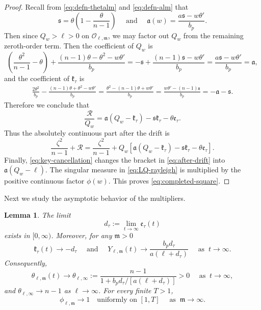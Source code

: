 \documentclass[reqno,12pt]{amsart}
\numberwithin{equation}{section}
\newtheorem{lem}[thm]{Lemma}
\theoremstyle{remark}
\begin{document}
\begin{proof}
Recall from \eqref{eq:defn-thetalm} and \eqref{eq:defn-alm} that 
$$\mathfrak s=\theta\left(1-\frac\theta {n-1}\right) \quad \text{ and } \quad \mathfrak a(w)= \frac{ a \mathfrak s- w\theta'}{b_p}. $$
Then since $Q_w>\ell>0$ on
$\mathcal O_{\ell,\mathfrak m}$, we may factor out $Q_w$
from the remaining zeroth-order term. Then the  coefficient of $Q_w$ is
$$
 \left(\frac{\theta^2}{n-1}-\theta\right)  +\frac{(n-1)\theta-\theta^2-w\theta'}{b_p} 
=-\mathfrak s+\frac{(n-1)\mathfrak s-w\theta'}{b_p}
=\frac{a\mathfrak s-w\theta'}{b_p}   =\mathfrak a,
$$
and the coefficient of $\mathfrak k_\tau$ is
\begin{align*}
\frac{2\theta^2}{b_p}  -\frac{(n-1)\theta+\theta^2-w\theta'}{b_p} 
=\frac{\theta^2-(n-1)\theta+w\theta'}{b_p}  =\frac{w\theta'-(n-1)\mathfrak s}{b_p} 
=-\mathfrak a-\mathfrak s.
\end{align*}
Therefore we conclude that
$$
 \frac{\mathcal R}{Q_w} =\mathfrak a(Q_w-\mathfrak k_\tau) -\mathfrak s\mathfrak k_\tau -\theta\mathfrak e_\tau.
$$
Thus the absolutely continuous part after the drift is
\begin{equation}\label{eq:after-drift}
\frac{\zeta^2}{n-1} + \mathcal R= \frac{\zeta^2}{n-1}
 +Q_w\left[ \mathfrak a(Q_w-\mathfrak k_\tau) 
-\mathfrak s\mathfrak k_\tau -\theta\mathfrak e_\tau
 \right].
\end{equation}
Finally, \eqref{eq:key-cancellation} changes the bracket in
\eqref{eq:after-drift} into $\mathfrak a(Q_w-\ell)$.  The singular measure in \eqref{eq:LQ-rayleigh} is multiplied by the positive continuous factor $\phi(w)$.  This proves \eqref{eq:completed-square}.
\end{proof}

Next we study the asymptotic behavior of the  multipliers.
\begin{lem}
The limit
$$
d_\tau:=\lim_{t\to\infty}\mathfrak e_\tau(t)
$$
exists in $[0,\infty)$.  Moreover, for any $\mathfrak m>0$
\begin{equation}\label{eq:k-e-limits}
\mathfrak k_\tau(t)\to-d_\tau \quad
\text{ and } \quad
Y_{\ell,\mathfrak m}(t)\to \frac{b_pd_\tau}{a(\ell+d_\tau)}
\quad \text{ as } \ t\to \infty. 
\end{equation}
Consequently,
\begin{equation}\label{eq:theta-infinity}
 \theta_{\ell,\mathfrak m}(t)\to
 \theta_{\ell,\infty}  :=\frac{n-1}{1+b_pd_\tau/[a(\ell+d_\tau)]}>0 \quad \text{ as } \ t\to \infty,
\end{equation}
and $\theta_{\ell,\infty}\to n-1$ as $\ell\to\infty$.
For every finite $T>1$,
\begin{equation}\label{eq:m-to-infinity}
\phi_{\ell,\mathfrak m}\to 1
\quad\text{uniformly on }[1,T] \quad \text{ as } \ \mathfrak m\to\infty.
\end{equation}
\end{lem}
\end{document}

